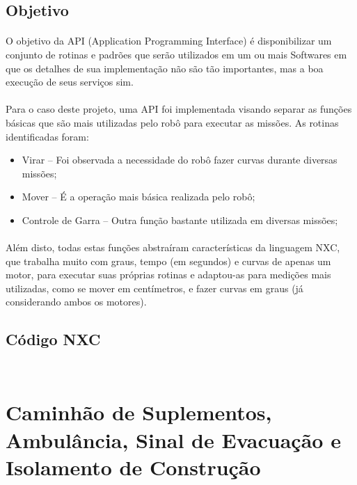 \documentclass{article}
\begin{document}
	\subsection{Objetivo}
		\paragraph{}
			O objetivo da API (Application Programming Interface) é 
			disponibilizar um conjunto de rotinas e padrões que serão utilizados 
			em um ou mais Softwares em que os detalhes de sua implementação não 
			são tão importantes, mas a boa execução de seus serviços sim.
		\paragraph{}
			Para o caso deste projeto, uma API foi implementada visando separar 
			as funções básicas que são mais utilizadas pelo robô para executar 
			as missões. As rotinas identificadas foram:

		\begin{itemize}
			\item Virar – Foi observada a necessidade do robô fazer curvas 
			durante diversas missões;
			\item Mover – É a operação mais básica realizada pelo robô;
			\item Controle de Garra – Outra função bastante utilizada em 
			diversas missões;
		\end{itemize}

		\paragraph{}
			Além disto, todas estas funções abstraíram características da 
			linguagem NXC, que trabalha muito com graus, tempo (em segundos) e 
			curvas de apenas um motor, para executar suas próprias rotinas e 
			adaptou-as para medições mais utilizadas, como se mover em 
			centímetros, e fazer curvas em graus (já considerando ambos os 
			motores).

	\subsection{Código NXC}
		\inputminted[linenos, frame = single]{c}{../theBugAPI.c}
			\label{lst: thebugapi.c}
		
		\inputminted[linenos, frame = single]{c}{../theBugAPI.h}
			\label{lst: thebugapi.h}

\newpage
\section{Caminhão de Suplementos, Ambulância, Sinal de Evacuação e Isolamento de 
Construção}
\end{document}

